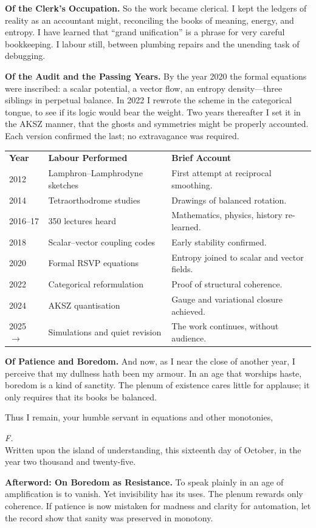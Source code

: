 \documentclass[12pt]{article}
\begin{document}
\textbf{Of the Clerk's Occupation.}
So the work became clerical. 
I kept the ledgers of reality as an accountant might, reconciling the books of meaning, energy, and entropy. 
I have learned that ``grand unification'' is a phrase for very careful bookkeeping. 
I labour still, between plumbing repairs and the unending task of debugging.

\textbf{Of the Audit and the Passing Years.}
By the year 2020 the formal equations were inscribed: a scalar potential, a vector flow, an entropy density---three siblings in perpetual balance. 
In 2022 I rewrote the scheme in the categorical tongue, to see if its logic would bear the weight. 
Two years thereafter I set it in the AKSZ manner, that the ghosts and symmetries might be properly accounted. 
Each version confirmed the last; no extravagance was required.

\begin{center}
\begin{tabular}{l l l}
\textbf{Year} & \textbf{Labour Performed} & \textbf{Brief Account} \\
2012 & Lamphron--Lamphrodyne sketches & First attempt at reciprocal smoothing.\\
2014 & Tetraorthodrome studies & Drawings of balanced rotation.\\
2016--17 & 350 lectures heard & Mathematics, physics, history re-learned.\\
2018 & Scalar--vector coupling codes & Early stability confirmed.\\
2020 & Formal RSVP equations & Entropy joined to scalar and vector fields.\\
2022 & Categorical reformulation & Proof of structural coherence.\\
2024 & AKSZ quantisation & Gauge and variational closure achieved.\\
2025 $\rightarrow$ & Simulations and quiet revision & The work continues, without audience.\\
\end{tabular}
\end{center}

\textbf{Of Patience and Boredom.}
And now, as I near the close of another year, I perceive that my dullness hath been my armour. 
In an age that worships haste, boredom is a kind of sanctity.
The plenum of existence cares little for applause; it only requires that its books be balanced.

Thus I remain, your humble servant in equations and other monotonies,

\bigskip
\begin{flushright}
\textit{F.}\\
\small Written upon the island of understanding, this sixteenth day of October, in the year two thousand and twenty-five.
\end{flushright}

\bigskip
\textbf{Afterword: On Boredom as Resistance.}
To speak plainly in an age of amplification is to vanish. 
Yet invisibility has its uses. 
The plenum rewards only coherence. 
If patience is now mistaken for madness and clarity for automation, let the record show that sanity was preserved in monotony.
\end{document}
